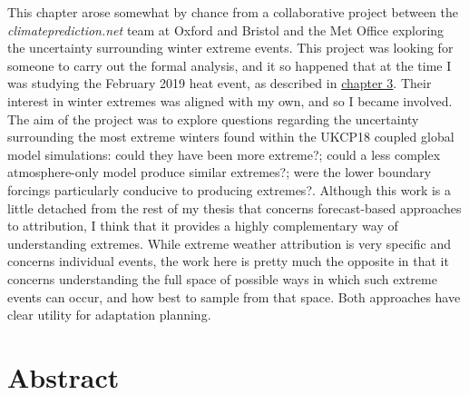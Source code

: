   This chapter arose somewhat by chance from a collaborative project between the \emph{climateprediction.net} team at Oxford and Bristol and the Met Office exploring the uncertainty surrounding winter extreme events. This project was looking for someone to carry out the formal analysis, and it so happened that at the time I was studying the February 2019 heat event, as described in \hyperref[ch3]{chapter 3}. Their interest in winter extremes was aligned with my own, and so I became involved. The aim of the project was to explore questions regarding the uncertainty surrounding the most extreme winters found within the UKCP18 coupled global model simulations: could they have been more extreme?; could a less complex atmosphere-only model produce similar extremes?; were the lower boundary forcings particularly conducive to producing extremes?. Although this work is a little detached from the rest of my thesis that concerns forecast-based approaches to attribution, I think that it provides a highly complementary way of understanding extremes. While extreme weather attribution is very specific and concerns individual events, the work here is pretty much the opposite in that it concerns understanding the full space of possible ways in which such extreme events can occur, and how best to sample from that space. Both approaches have clear utility for adaptation planning.

\section{Abstract}\label{ch5:abstract}


